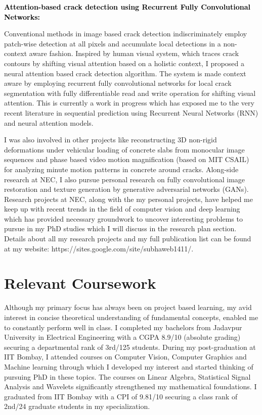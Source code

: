 \documentclass{article}
\newcommand{\statement}[1]{\par\medskip
	{\textcolor{black}{\textbf{#1:}}}\space
}
\begin{document}
	\statement{Attention-based crack detection using Recurrent Fully Convolutional Networks}
	Conventional methods in image based crack detection indiscriminately employ patch-wise detection at all pixels and accumulate local detections in a non-context aware fashion. Inspired by human visual system, which traces crack contours by shifting visual attention based on a holistic context, I proposed a neural attention based crack detection algorithm. The system is made context aware by employing recurrent fully convolutional networks for local crack segmentation with fully differentiable read and write operation for shifting visual attention. This is currently a work in progress which has exposed me to the very recent literature in sequential prediction using Recurrent Neural Networks (RNN) and neural attention models.
	
	\vspace{0.1cm}
	I was also involved in other projects like reconstructing 3D non-rigid deformations under vehicular loading of concrete slabs from monocular image sequences and phase based video motion magnification (based on MIT CSAIL) for analyzing minute motion patterns in concrete around cracks. Along-side research at NEC, I also pursue personal research on fully convolutional image restoration and texture generation by generative adversarial networks (GANs). Research projects at NEC, along with the my personal projects, have helped me keep up with recent trends in the field of computer vision and deep learning which has provided necessary groundwork to uncover interesting problems to pursue in my PhD studies which I will discuss in the research plan section. Details about all my research projects and my full publication list can be found at my website: https://sites.google.com/site/subhaweb1411/.

	\vspace*{-0.25cm}
	\section{Relevant Coursework}
	\vspace*{-0.25cm}
	Although my primary focus has always been on project based learning, my avid interest in concise theoretical understanding of fundamental concepts, enabled me to constantly perform well in class. I completed my bachelors from Jadavpur University in Electrical Engineering with a CGPA 8.9/10 (absolute grading) securing a departmental rank of 3rd/125 students. During my post-graduation at IIT Bombay, I attended courses on Computer Vision, Computer Graphics and Machine learning through which I developed my interest and started thinking of pursuing PhD in these topics. The courses on Linear Algebra, Statistical Signal Analysis and Wavelets significantly strengthened my mathematical foundations. I graduated from IIT Bombay with a CPI of 9.81/10 securing a class rank of 2nd/24 graduate students in my specialization.
	
\end{document}
